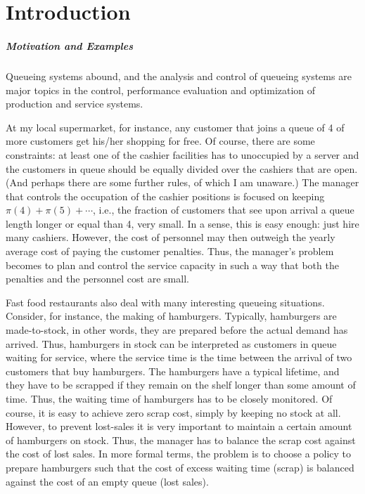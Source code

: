 \chapter{Introduction}\label{sec:introduction}

\paragraph{Motivation and Examples}
Queueing systems abound, and the analysis and control of queueing
systems are major topics in the control, performance evaluation and
optimization of production and service systems. 


At my local supermarket, for instance, any customer that joins a queue
of 4 of more customers get his/her shopping for free. Of course, there
are some constraints: at least one of the cashier facilities has to
unoccupied by a server and the customers in queue should be equally
divided over the cashiers that are open. (And perhaps there are some
further rules, of which I am unaware.) The manager that controls the
occupation of the cashier positions is focused on keeping
$\pi(4)+\pi(5)+\cdots$, i.e., the fraction of customers that see upon
arrival a queue length longer or equal than 4, very small. In a sense,
this is easy enough: just hire many cashiers. However, the cost of
personnel may then outweigh the yearly average cost of paying the
customer penalties. Thus, the manager's problem becomes to plan and
control the service capacity  in such a way that both
the penalties and the personnel cost are small.

Fast food restaurants also deal with many interesting queueing
situations. Consider, for instance, the making of
hamburgers. Typically, hamburgers are made-to-stock, in other words,
they are prepared before the actual demand has arrived. Thus, hamburgers
in stock can be interpreted as customers in queue waiting for service,
where the service time is the time between the arrival of two
customers that buy hamburgers. The hamburgers have a typical lifetime,
and they have to be scrapped if they remain on the shelf longer than
some amount of time. Thus, the waiting time of hamburgers has to be
closely monitored. Of course, it is easy to achieve zero scrap cost,
simply by keeping no stock at all.  However, to prevent lost-sales it
is very important to maintain a certain amount of hamburgers on
stock. Thus, the manager has to balance the scrap cost against the
cost of lost sales. In more formal terms, the problem is to choose a
policy to prepare hamburgers such that the cost of excess waiting time
(scrap) is balanced against the cost of an empty queue (lost sales).

